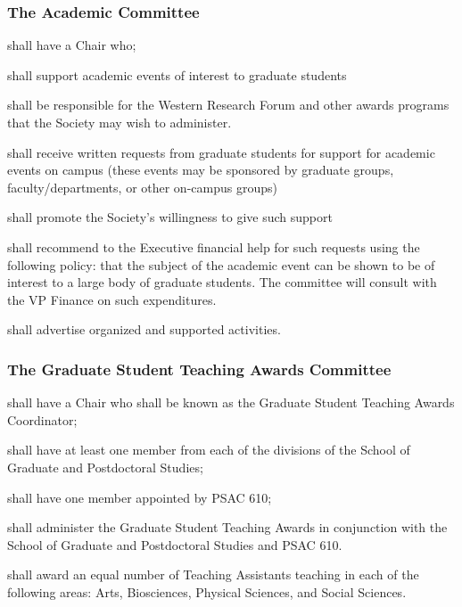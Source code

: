 \subsubsection{The Academic Committee}
\begin{longenum}[ label*=\thesubsubsection.\arabic*., align=left]
	\item shall have a Chair who;
    \item shall support academic events of interest to graduate students
    \item shall be responsible for the Western Research Forum and other awards programs that the Society may wish to administer.
    \item shall receive written requests from graduate students for support for academic events on campus (these events may be sponsored by graduate groups, faculty/departments, or other on-campus groups)
    \item shall promote the Society's willingness to give such support
    \item shall recommend to the Executive financial help for such requests using the following policy: that the subject of the academic event can be shown to be of interest to a large body of graduate students. The committee will consult with the VP Finance on such expenditures.
    \item shall advertise organized and supported activities.
\end{longenum}

\subsubsection{The Graduate Student Teaching Awards Committee}
\begin{longenum}[ label*=\thesubsubsection.\arabic*., align=left]
	\item shall have a Chair who shall be known as the Graduate Student Teaching Awards Coordinator;
    \item shall have at least one member from each of the divisions of the School of Graduate and Postdoctoral Studies;
    \item shall have one member appointed by PSAC 610;
    \item shall administer the Graduate Student Teaching Awards in conjunction with the School of Graduate and Postdoctoral Studies and PSAC 610.
    \item shall award an equal number of Teaching Assistants teaching in each of the following areas: Arts, Biosciences, Physical Sciences, and Social Sciences.
\end{longenum}


